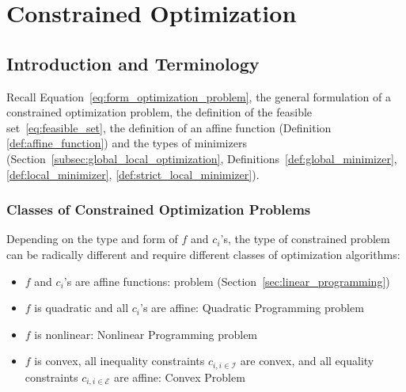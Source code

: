 \documentclass[9pt, headings=standardclasses, parskip=half]{scrartcl}
\renewcommand{\emph}[1]{\textcolor{mypurple}{#1}}
\newcommand{\vect}[1]{\vec{\boldsymbol{#1}}}
\begin{document}
\clearpage
\section{Constrained Optimization}\label{sec:constrained_optimization}
\subsection{Introduction and Terminology}\label{sec:intro_constrained_optimization}
Recall Equation~\eqref{eq:form_optimization_problem}, the general formulation of a constrained optimization problem, the definition of the feasible set~\eqref{eq:feasible_set}, the definition of an affine function (Definition \ref{def:affine_function}) and the types of minimizers (Section~\ref{subsec:global_local_optimization}, Definitions~\ref{def:global_minimizer}, \ref{def:local_minimizer}, \ref{def:strict_local_minimizer}).

\subsubsection{Classes of Constrained Optimization Problems}
Depending on the type and form of $f$ and $c_i$'s, the type of constrained problem can be radically different and require different classes of optimization algorithms:
\begin{itemize}
  \item $f$ and $c_i$'s are \emph{affine} functions:  problem (Section~\ref{sec:linear_programming})
  \item $f$ is \emph{quadratic} and all $c_i$'s are \emph{affine}: Quadratic Programming problem
  \item $f$ is \emph{nonlinear}: Nonlinear Programming problem
  \item $f$ is \emph{convex}, all inequality constraints $c_{i,i\in\mathcal{I}}$ are \emph{convex}, and all equality constraints $c_{i,i\in\mathcal{E}}$ are \emph{affine}: Convex Problem
\end{itemize}
\end{document}
